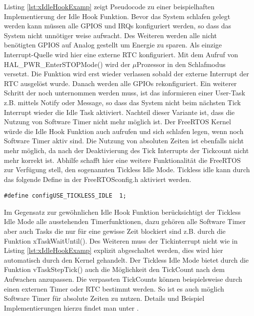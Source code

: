 Listing \ref{lst:xIdleHookExamp} zeigt Pseudocode zu einer beispielhaften Implementierung der Idle Hook Funktion. Bevor das System schlafen gelegt werden kann müssen alle GPIOS und IRQs konfiguriert werden, so dass das System nicht unnötiger weise aufwacht. Des Weiteren werden alle nicht benötigten GPIOS auf Analog gestellt um Energie zu sparen. Als einzige Interrupt-Quelle wird hier eine externe RTC konfiguriert. Mit dem Aufruf von HAL\_PWR\_EnterSTOPMode() wird der $\mu$\-Pro\-zesso\-r in den Schlafmodus versetzt. Die Funktion wird erst wieder verlassen sobald der externe Interrupt der RTC ausgelöst wurde. Danach werden alle GPIOs rekonfiguriert. Ein weiterer Schritt der noch unternommen werden muss, ist das informieren einer User-Task z.B. mittels Notify oder Message, so dass das System nicht beim nächsten Tick Interrupt wieder die Idle Task aktiviert. Nachteil dieser Variante ist, dass die Nutzung von Software Timer nicht mehr möglich ist. Der FreeRTOS Kernel würde die Idle Hook Funktion auch aufrufen und sich schlafen legen, wenn noch Software Timer aktiv sind. Die Nutzung von absoluten Zeiten ist ebenfalls nicht mehr möglich, da nach der Deaktivierung des Tick Interrupts der Tickcount nicht mehr korrekt ist. Abhilfe schafft hier eine weitere Funktionalität die FreeRTOS zur Verfügung stell, den sogenannten Tickless Idle Mode. Tickless idle kann durch das folgende Define in der FreeRTOSconfig.h aktiviert werden.  
\begin{lstlisting}[label=lst:defineTicklessIdle, numbers = none]
#define configUSE_TICKLESS_IDLE  1; 
\end{lstlisting}
Im Gegensatz zur gewöhnlichen Idle Hook Funktion be\-rück\-sich\-tigt der Tickless Idle Mode alle ausstehenden Timerfunktionen, dazu gehören alle Software Timer aber auch Tasks die nur für eine gewisse Zeit blockiert sind z.B. durch die Funktion xTaskWaitUntil(). Des Weiteren muss der Tickinterrupt nicht wie in Listing \ref{lst:xIdleHookExamp} explizit abgeschaltet werden, dies wird hier automatisch durch den Kernel gehandelt. Der Tickless Idle Mode bietet durch die Funktion vTaskStepTick() auch die Möglichkeit den TickCount nach dem Aufwachen anzupassen. Die verpassten TickCounts können beispielsweise durch einen externen Timer oder RTC bestimmt werden. So ist es auch möglich Software Timer für absolute Zeiten zu nutzen. Details und Beispiel Implementierungen hierzu findet man unter \cite{FreeRtosAdvanced}.  

